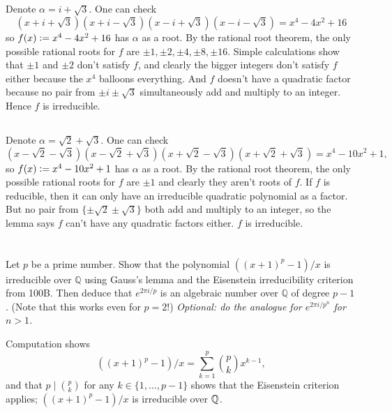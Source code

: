 \documentclass[12pt]{article}
\begin{document}
\subsection{} 
Denote $\alpha = i + \sqrt{3}$. 
One can check 
$$(x + i + \sqrt{3})(x + i - \sqrt{3})(x - i + \sqrt{3})(x - i - \sqrt{3}) = x^4 - 4x^2 + 16$$
so $f(x) \vcentcolon= x^4 - 4x^2 + 16$ has $\alpha$ as a root. 
By the rational root theorem, the only possible rational roots for $f$ are $\pm 1, \pm 2, \pm 4, \pm 8, \pm 16$. 
Simple calculations show that $\pm 1$ and $\pm 2$ don't satisfy $f$, and clearly the bigger integers don't satisfy $f$ either because the $x^4$ balloons everything. 
And $f$ doesn't have a quadratic factor because no pair from $\pm i \pm \sqrt{3}$ simultaneously add and multiply to an integer. 
Hence $f$ is irreducible. 

\subsection{}
Denote $\alpha = \sqrt{2} + \sqrt{3}$. 
One can check 
$$(x - \sqrt{2} - \sqrt{3})(x - \sqrt{2} + \sqrt{3})(x + \sqrt{2} - \sqrt{3})(x + \sqrt{2} + \sqrt{3}) = x^4 - 10x^2 + 1,$$
so $f(x) \vcentcolon= x^4 - 10x^2 + 1$ has $\alpha$ as a root. 
By the rational root theorem, the only possible rational roots for $f$ are $\pm 1$ and clearly they aren't roots of $f$. 
If $f$ is reducible, then it can only have an irreducible quadratic polynomial as a factor. 
But no pair from $\{\pm \sqrt{2} \pm \sqrt{3}\}$ both add and multiply to an integer, so the lemma says $f$ can't have any quadratic factors either. 
$f$ is irreducible. 
 
\section{}
 
Let $p$ be a prime number. Show that the polynomial $((x+1)^p - 1)/x$ is irreducible over $\mathbb{Q}$ using Gauss's lemma and the Eisenstein irreducibility criterion from 100B. Then deduce that $e^{2\pi i/p}$ is an algebraic number over $\mathbb{Q}$ of degree $p-1$. (Note that this works even for $p=2$!) \emph{Optional: do the analogue for $e^{2\pi i/p^n}$ for $n > 1$.}

\noindent\dotfill 

Computation shows 
$$((x + 1)^{p} - 1)/x = \sum_{k = 1}^{p} \binom{p}{k} x^{k - 1}, $$
and that $p \mid \binom{p}{k}$ for any $k \in \{1, \ldots, p - 1\}$ shows that the Eisenstein criterion applies; 
$((x + 1)^{p} - 1)/x$ is irreducible over $\mathbb{Q}$. 
\end{document}
